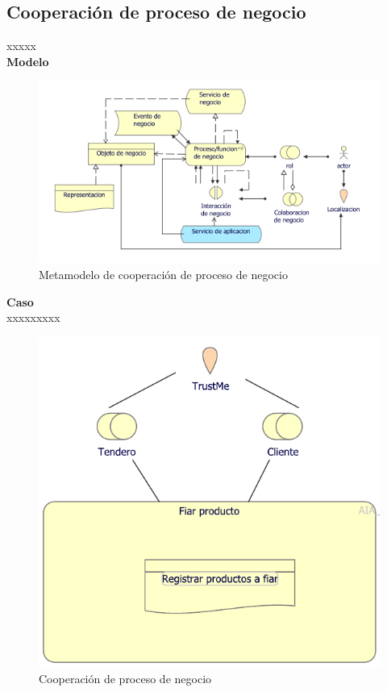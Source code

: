 	\subsection{Cooperación de proceso de negocio}
	{ xxxxx\\
		
		\textbf{Modelo}\\
		\begin{figure}[H]
			\centering
			\includegraphics[width=0.8\linewidth]{development/cooperacionproceso.png}
			\caption{Metamodelo de cooperación de proceso de negocio}
		\end{figure}
		
		\textbf{Caso}\\
		xxxxxxxxx\\
		
		\begin{figure}[H]
			\centering
			\includegraphics[width=0.8\linewidth]{development/cooperacionproceso.pdf}
			\caption{Cooperación de proceso de negocio}
		\end{figure}
	}
	
